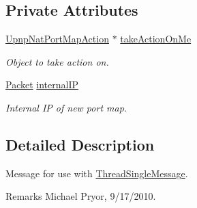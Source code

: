 \subsection*{Private Attributes}
\begin{DoxyCompactItemize}
\item 
\hypertarget{class_thread_message_item_set_port_map_internal_i_p_a98778535e120a46f73f7a7ab85856b0e}{
\hyperlink{class_upnp_nat_port_map_action}{UpnpNatPortMapAction} $\ast$ \hyperlink{class_thread_message_item_set_port_map_internal_i_p_a98778535e120a46f73f7a7ab85856b0e}{takeActionOnMe}}
\label{class_thread_message_item_set_port_map_internal_i_p_a98778535e120a46f73f7a7ab85856b0e}

\begin{DoxyCompactList}\small\item\em Object to take action on. \item\end{DoxyCompactList}\item 
\hyperlink{class_packet}{Packet} \hyperlink{class_thread_message_item_set_port_map_internal_i_p_affffbd207f88ef6e0df40e7c1103d22e}{internalIP}
\begin{DoxyCompactList}\small\item\em Internal IP of new port map. \item\end{DoxyCompactList}\end{DoxyCompactItemize}


\subsection{Detailed Description}
Message for use with \hyperlink{class_thread_single_message}{ThreadSingleMessage}. \begin{DoxyRemark}{Remarks}
Michael Pryor, 9/17/2010. 
\end{DoxyRemark}



